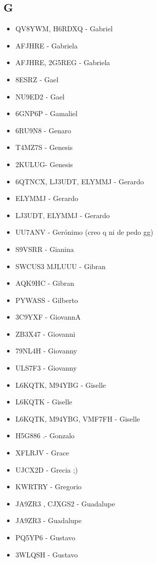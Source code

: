 \subsection*{G}
\begin{itemize}[leftmargin=*,nosep]
\item QV8YWM, H6RDXQ - Gabriel
\item AFJHRE - Gabriela
\item AFJHRE, 2G5REG - Gabriela
\item 8ESRZ - Gael
\item NU9ED2 - Gael
\item 6GNP6P - Gamaliel
\item 6RU9N8 - Genaro
\item T4MZ7S - Genesis
\item 2KULUG- Genesis
\item 6QTNCX, LJ3UDT, ELYMMJ - Gerardo
\item ELYMMJ - Gerardo
\item LJ3UDT, ELYMMJ - Gerardo
\item UU7ANV - Gerónimo (creo q ni de pedo gg)
\item S9VSRR - Gianina
\item SWCUS3  MJLUUU - Gibran
\item AQK9HC - Gibran
\item PYWASS - Gilberto
\item 3C9YXF - GiovannA
\item ZB3X47 - Giovanni
\item 79NL4H - Giovanny
\item ULS7F3 - Giovanny
\item L6KQTK, M94YBG - Giselle
\item L6KQTK - Giselle
\item L6KQTK, M94YBG, VMF7FH - Giselle
\item H5G886 .- Gonzalo
\item XFLRJV - Grace
\item UJCX2D - Grecia ;)
\item KWRTRY - Gregorio
\item JA9ZR3 , CJXGS2 - Guadalupe
\item JA9ZR3 - Guadalupe
\item PQ5YP6 - Gustavo
\item 3WLQSH - Gustavo
\end{itemize}

